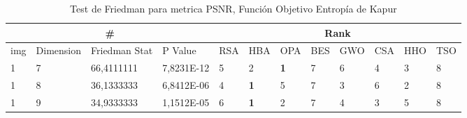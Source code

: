 \documentclass[conference]{IEEEtran}
\begin{document}
\begin{table*}[]
	\centering
	\caption{Test de Friedman para metrica PSNR, Función Objetivo Entropía de Kapur}
	\begin{tabular}{|llll|llllllll|}
		\hline
		\multicolumn{4}{|c|}{\#} & \multicolumn{8}{c|}{Rank} \\ \hline
		\multicolumn{1}{|l|}{img} & \multicolumn{1}{l|}{Dimension} & \multicolumn{1}{l|}{Friedman Stat} & P Value & \multicolumn{1}{l|}{RSA} & \multicolumn{1}{l|}{HBA} & \multicolumn{1}{l|}{OPA} & \multicolumn{1}{l|}{BES} & \multicolumn{1}{l|}{GWO} & \multicolumn{1}{l|}{CSA} & \multicolumn{1}{l|}{HHO} & TSO \\ \hline 
\multicolumn{1}{|l|}{1}                                                     & \multicolumn{1}{l|}{7}                                                        & \multicolumn{1}{l|}{66,4111111}                                                   & 7,8231E-12                     & \multicolumn{1}{l|}{5}                                                  & \multicolumn{1}{l|}{2}                                                  & \multicolumn{1}{l|}{\textbf{1}}                                         & \multicolumn{1}{l|}{7}                                                  & \multicolumn{1}{l|}{6}                                                  & \multicolumn{1}{l|}{4}                                                  & \multicolumn{1}{l|}{3}                                                  & 8                          \\ \hline
\multicolumn{1}{|l|}{1}                                                     & \multicolumn{1}{l|}{8}                                                        & \multicolumn{1}{l|}{36,1333333}                                                   & 6,8412E-06                     & \multicolumn{1}{l|}{4}                                                  & \multicolumn{1}{l|}{\textbf{1}}                                         & \multicolumn{1}{l|}{5}                                                  & \multicolumn{1}{l|}{7}                                                  & \multicolumn{1}{l|}{3}                                                  & \multicolumn{1}{l|}{6}                                                  & \multicolumn{1}{l|}{2}                                                  & 8                          \\ \hline
\multicolumn{1}{|l|}{1}                                                     & \multicolumn{1}{l|}{9}                                                        & \multicolumn{1}{l|}{34,9333333}                                                   & 1,1512E-05                     & \multicolumn{1}{l|}{6}                                                  & \multicolumn{1}{l|}{\textbf{1}}                                         & \multicolumn{1}{l|}{2}                                                  & \multicolumn{1}{l|}{7}                                                  & \multicolumn{1}{l|}{4}                                                  & \multicolumn{1}{l|}{3}                                                  & \multicolumn{1}{l|}{5}                                                  & 8                          \\ \hline

\end{tabular}
\end{table*}
\end{document}
